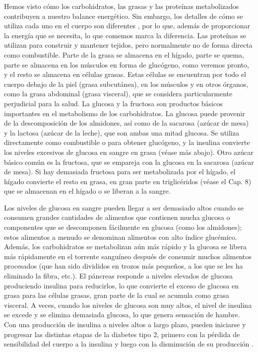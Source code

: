 \documentclass[12pt]{book}
\begin{document}
Hemos visto cómo los carbohidratos, las grasas y las proteínas metabolizados contribuyen a nuestro balance energético. Sin embargo, los detalles de cómo se utiliza cada uno en el cuerpo son diferentes \cite{56}, por lo que, además de proporcionar la energía que se necesita, lo que comemos marca la diferencia. Las proteínas se utilizan para construir y mantener tejidos, pero normalmente no de forma directa como combustible. Parte de la grasa se almacena en el hígado, parte se quema, parte se almacena en los músculos en forma de glucógeno, como veremos pronto, y el resto se almacena en células grasas. Estas células se encuentran por todo el cuerpo debajo de la piel (grasa subcutánea), en los músculos y en otros órganos, como la grasa abdominal (grasa visceral), que se considera particularmente perjudicial para la salud. La glucosa y la fructosa son productos básicos importantes en el metabolismo de los carbohidratos. La glucosa puede provenir de la descomposición de los almidones, así como de la sacarosa (azúcar de mesa) y la lactosa (azúcar de la leche), que son ambas una mitad glucosa. Se utiliza directamente como combustible o para obtener glucógeno, y la insulina convierte los niveles excesivos de glucosa en sangre en grasa (véase más abajo). Otro azúcar básico común es la fructosa, que se empareja con la glucosa en la sacarosa (azúcar de mesa). Si hay demasiada fructosa para ser metabolizada por el hígado, el hígado convierte el resto en grasa, en gran parte en triglicéridos (véase el Cap. 8) que se almacenan en el hígado o se liberan a la sangre.

Los niveles de glucosa en sangre pueden llegar a ser demasiado altos cuando se consumen grandes cantidades de alimentos que contienen mucha glucosa o componentes que se descomponen fácilmente en glucosa (como los almidones); estos alimentos a menudo se denominan alimentos con alto índice glucémico. Además, los carbohidratos se metabolizan aún más rápido y la glucosa se libera más rápidamente en el torrente sanguíneo después de consumir muchos alimentos procesados (que han sido divididos en trozos más pequeños, a los que se les ha eliminado la fibra, etc.). El páncreas responde a niveles elevados de glucosa produciendo insulina para reducirlos, lo que convierte el exceso de glucosa en grasa para las células grasas, gran parte de la cual se acumula como grasa visceral. A veces, cuando los niveles de glucosa son muy altos, el nivel de insulina se excede y se elimina demasiada glucosa, lo que genera sensación de hambre. Con una producción de insulina a niveles altos a largo plazo, pueden iniciarse y progresar las distintas etapas de la diabetes tipo 2, primero con la pérdida de sensibilidad del cuerpo a la insulina y luego con la disminución de su producción \cite{56}.
\end{document}
